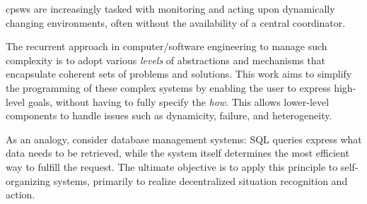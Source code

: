 \acp{cpsw} are increasingly tasked with monitoring and acting upon dynamically changing environments, 
 often without the availability of a central coordinator.%

The recurrent approach in computer/software engineering 
 to manage such complexity is to adopt various \emph{levels} of abstractions 
 and mechanisms that encapsulate coherent sets of problems and solutions. 
This work aims to simplify the programming of these complex systems by enabling the user to express high-level goals, 
 without having to fully specify the \emph{how}. 
 This allows lower-level components to handle issues such as dynamicity, failure, and heterogeneity.

As an analogy, consider database management systems: 
 SQL queries express what data needs to be retrieved, while the system itself determines the most efficient way to fulfill the request. 
 The ultimate objective is to apply this principle to self-organizing systems, primarily to realize decentralized situation recognition and action.

